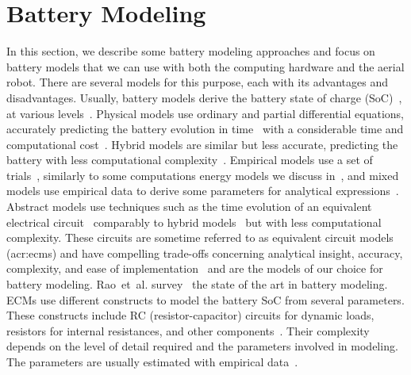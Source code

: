 \section{Battery Modeling}
\label{sec:soa-ene-bat}

In this section, we describe some battery modeling approaches and focus on battery models that we can use with both the computing hardware and the aerial robot. There are several models for this purpose, each with its advantages and disadvantages. Usually, battery models derive the battery state of charge (SoC)~\citep{xia2015state}, at various levels~\citep{sunden2019thermal,kurzweil2018state,kurzweil2021state,deng2017maximum}. Physical models use ordinary and partial differential equations, accurately predicting the battery evolution in time~\citep{rao2003battery} with a considerable time and computational cost~\citep{doyle1993modeling,marcicki2013design,lotfi2017reduced,moura2017battery}. Hybrid models are similar but less accurate, predicting the battery with less computational complexity~\citep{kim2011hybrid,kim2019enhanced}. Empirical models use a set of trials~\citep{syracuse1997statistical,pedram1999design}, similarly to some computations energy models we discuss in~, and mixed models use empirical data to derive some parameters for analytical expressions~\citep{rao2003battery,rakhmatov2001analytical}. Abstract models use techniques such as the time evolution of an equivalent electrical circuit~\citep{gold1997pspice,benini2001discrete,seongjun2008state,xiaosong2012comparative,xing2014state,hasan2018exogenous} comparably to hybrid models~\citep{kim2011hybrid} but with less computational complexity. These circuits are sometime referred to as equivalent circuit models (\Gls{acr:ecm}s) and have compelling trade-offs concerning analytical insight, accuracy, complexity, and ease of implementation~\citep{rao2003battery} and are the models of our choice for battery modeling. Rao~et~al. survey~\citep{rao2003battery} the state of the art in battery modeling. ECMs use different constructs to model the battery SoC from several parameters. These constructs include RC (resistor-capacitor) circuits for dynamic loads, resistors for internal resistances, and other components~\citep{hamza2017forecasting}. Their complexity depends on the level of detail required and the parameters involved in modeling. The parameters are usually estimated with empirical data~\citep{zhang2014battery}.

